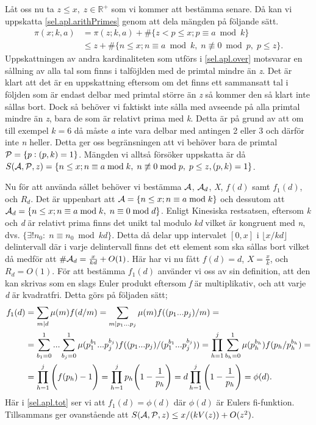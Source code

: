 Låt oss nu ta \(z\leq x,\; z \in \mathbb{R}^+\) som vi kommer att bestämma senare. Då kan vi uppskatta \eqref{sel.apl.arithPrimes} genom att dela mängden på följande sätt.
\begin{align}
    \pi(x;k,a) &= \pi(z;k,a) + \#\{z<p\leq x; p \equiv a \bmod{k}\} \nonumber\\
    &\leq z + \#\{n\leq x; n \equiv a \bmod k,\; n \not\equiv 0 \bmod p,\; p\leq z\}.\label{sel.apl.over}
\end{align}
Uppskattningen av andra kardinaliteten som utförs i \eqref{sel.apl.over} motsvarar en sållning av alla tal som finns i talföjlden med de primtal mindre än \textit{z}. 
Det är klart att det är en uppskattning eftersom om det finns ett sammansatt tal i följden som är endast delbar med primtal större än \textit{z} så kommer den så klart inte sållas bort. 
Dock så behöver vi faktiskt inte sålla med avseende på alla primtal mindre än \textit{z}, bara de som är relativt prima med \textit{k}. Detta är på grund av att om till exempel \(k = 6\) då måste \textit{a} inte vara delbar med antingen 2 eller 3 och därför inte \textit{n} heller. 
Detta ger oss begränsningen att vi behöver bara de primtal \(\P = \{p: (p, k) = 1\}\). 
Mängden vi alltså försöker uppskatta är då \(\S{A}{P}{z} = \{n\leq x; n \equiv a \bmod k,\; n \not\equiv 0 \bmod p,\; p\leq z, (p,k) = 1\}\).

Nu för att använda sållet behöver vi bestämma \(\A\), \(\A_d\), \textit{X}, \(f(d)\) samt \(f_1(d)\), och \(R_d\). 
Det är uppenbart att \(\A = \{n\leq x; n \equiv a \bmod k\}\) och dessutom att \(\A_d = \{n \leq x; n \equiv a \bmod k,\; n \equiv 0 \bmod d\}\). 
Enligt Kinesiska restsatsen, eftersom \textit{k} och \textit{d} är relativt prima finns det unikt tal modulo \textit{kd} vilket är kongruent med \textit{n}, dvs. \(\{\exists! n_0:\; n \equiv n_0 \bmod kd\}\). 
Detta då delar upp intervalet \([0, x]\) i \(\lfloor x/{kd}\rfloor\) delintervall där i varje delintervall finns det ett element som ska sållas bort vilket då medför att \(\#\A_d = \frac{x}{kd} + O(1)\). 
Här har vi nu fått \(f(d) = d\), \(X = \frac{x}{k}\), och \(R_d = O(1)\). 
För att bestämma \(f_1(d)\) använder vi oss av sin definition, att den kan skrivas som en slags Euler produkt eftersom \textit{f} är multiplikativ, och att varje \textit{d} är kvadratfri. 
Detta görs på följaden sätt;
\begin{align}
    f_1(d) &= \sum_{m\divides d}\mu(m)f(d/m) = \sum_{m\divides p_1...p_j}\mu(m)f((p_1...p_j)/m) = \nonumber\\
    &=\sum_{b_1 = 0}^1...\sum_{b_j = 0}^1\mu(p_1^{b_1}...p_j^{b_j})f((p_1...p_j)/(p_1^{b_1}...p_j^{b_j})) = \prod_{h = 1}^j\sum_{b_h = 0}^1\mu(p_h^{b_h})f(p_h/p_h^{b_h}) = \nonumber\\
    &= \prod_{h = 1}^j\Bigg(f(p_h) - 1\Bigg) = \prod_{h = 1}^j p_h\Bigg(1 - \frac{1}{p_h}\Bigg) = d\prod_{h = 1}^j \Bigg(1 - \frac{1}{p_h}\Bigg) = \phi(d).\label{sel.apl.tot}
\end{align}
Här i \eqref{sel.apl.tot} ser vi att \(f_1(d) = \phi(d)\) där \(\phi(d)\) är Eulers fi-funktion. 
Tillsammans ger ovanstående att \(\S{A}{P}{z} \leq x/(kV(z)) + O(z^2)\). 

